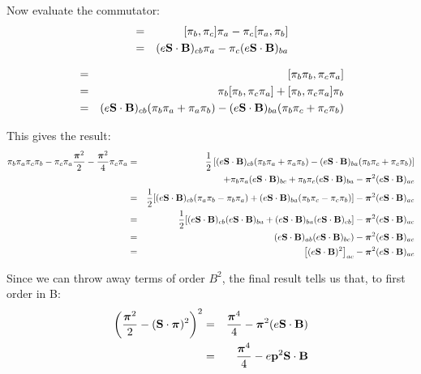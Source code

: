 Now evaluate the commutator:
\begin{eqnarray*}
[\pi_b, \pi_c \pi_a]
	&=&	[\pi_b, \pi_c]\pi_a - \pi_c [\pi_a, \pi_b]	\\
	&=&	(e \v{S} \cdot \v{B})_{cb} \pi_a
				- \pi_c (e \v{S} \cdot \v{B})_{ba}	\\
\end{eqnarray*}

\begin{eqnarray*}
[ \gv{\pi}^2, \pi_c \pi_a]
	&=&	[\pi_b \pi_b, \pi_c \pi_a]	\\
	&=&	\pi_b [\pi_b, \pi_c \pi_a] + [\pi_b, \pi_c \pi_a] \pi_b	\\
	&=&	(e \v{S} \cdot \v{B})_{cb} ( \pi_b \pi_a + \pi_a \pi_b)
				-  (e \v{S} \cdot \v{B})_{ba} (\pi_b \pi_c + \pi_c \pi_b)	\\
\end{eqnarray*}


This gives the result:
\begin{eqnarray*}
\pi_b \pi_a \pi_c \pi_b  
	- \pi_c \pi_a \frac{\mbox{\boldmath$ \pi $}^2}{2} 
	- \frac{\mbox{\boldmath$ \pi $}^2}{4} \pi_c \pi_a
	&=&	\frac{1}{2} \left [ (e \mathbf{S} \cdot \mathbf{B})_{cb} ( \pi_b \pi_a + \pi_a \pi_b)
				-  (e \mathbf{S} \cdot \mathbf{B})_{ba} (\pi_b \pi_c + \pi_c \pi_b)  \right  ] \\
	&&		+ \pi_b \pi_a (e \mathbf{S} \cdot \mathbf{B})_{bc} 
				+ \pi_b \pi_c (e \mathbf{S} \cdot \mathbf{B})_{ba}
				-\mbox{\boldmath$ \pi $}^2 (e \mathbf{S} \cdot \mathbf{B})_{ac}	\\
	&=&	\frac{1}{2} [(e \mathbf{S} \cdot \mathbf{B})_{cb} ( \pi_a \pi_b - \pi_b \pi_a)
				+ (e \mathbf{S} \cdot \mathbf{B})_{ba} (\pi_b \pi_c - \pi_c \pi_b)]
				-\mbox{\boldmath$ \pi $}^2 (e \mathbf{S} \cdot \mathbf{B})_{ac}	\\
	&=&	\frac{1}{2} [(e \mathbf{S} \cdot \mathbf{B})_{cb} (e \mathbf{S} \cdot \mathbf{B})_{ba}
				+ (e \mathbf{S} \cdot \mathbf{B})_{ba} (e \mathbf{S} \cdot \mathbf{B})_{cb}]
				-\mbox{\boldmath$ \pi $}^2 (e \mathbf{S} \cdot \mathbf{B})_{ac}	\\
	&=&	(e \mathbf{S} \cdot \mathbf{B})_{ab}(e \mathbf{S} \cdot \mathbf{B})_{bc})
				-\mbox{\boldmath$ \pi $}^2 (e \mathbf{S} \cdot \mathbf{B})_{ac}	\\
	&=&	\left[ (e \mathbf{S} \cdot \mathbf{B})^2 \right ]_{ac}
				-\mbox{\boldmath$ \pi $}^2 (e \mathbf{S} \cdot \mathbf{B})_{ac}	\\
\end{eqnarray*}

Since we can throw away terms of order $B^2$, the final result tells us that, to first order in B:
\begin{eqnarray*}
 \left(  \frac {\mbox{\boldmath$ \pi $}^2} {2} -  (\mathbf{S} \cdot \mbox{\boldmath$ \pi $})^2   \right )^2
	&=&	\frac{ \mbox{\boldmath$ \pi $}^4 } {4}  -  \mbox{\boldmath$ \pi $}^2 (e \mathbf{S} \cdot \mathbf{B}) \\
	&=& 	\frac{ \mbox{\boldmath$ \pi $}^4 } {4}  -  e \mathbf{p}^2  \mathbf{S} \cdot \mathbf{B} \\
\end{eqnarray*}

